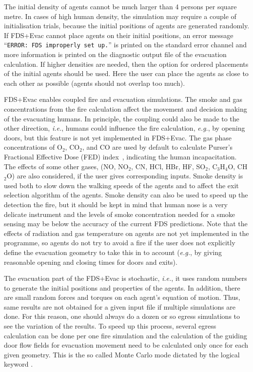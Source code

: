\documentclass[12pt,a4paper,final,twoside]{stylevk}
\begin{document}
The initial density of agents cannot be much larger than 4 persons per
square metre.  In cases of high human density, the simulation may
require a couple of initialisation trials, because the initial
positions of agents are generated randomly.  If FDS+Evac cannot place
agents on their initial positions, an error message ``\texttt{ERROR:
  FDS improperly set up.}'' is printed on the standard error channel
and more information is printed on the diagnostic output file of the
evacuation calculation.  If higher densities are needed, then the
option for ordered placements of the initial agents should be used.
Here the user can place the agents as close to each other as
possible (agents should not overlap too much). 


FDS+Evac enables coupled fire and evacuation simulations.  The smoke
and gas concentrations from the fire calculation affect the movement
and decision making of the evacuating humans.  In principle, the
coupling could also be made to the other direction, \emph{i.e.},
humans could influence the fire calculation, \emph{e.g.}, by opening
doors, but this feature is not yet implemented in FDS+Evac.  The gas
phase concentrations of $\mathrm{O_2}$, $\mathrm{CO_2}$, and
$\mathrm{CO}$ are used by default to calculate Purser's Fractional
Effective Dose (FED) index~\cite{Purser03}, indicating the human
incapacitation.  The effects of some other gases, (NO, NO${}_2$, CN,
HCl, HBr, HF, SO${}_2$, C${}_3$H${}_4$O, CH${}_2$O) are also
considered, if the user gives corresponding inputs.  Smoke density is
used both to slow down the walking speeds of the agents and to affect
the exit selection algorithm of the agents.  Smoke density can also be
used to speed up the detection the fire, but it should be kept in mind
that human nose is a very delicate instrument and the levels of smoke
concentration needed for a smoke sensing may be below the accuracy of
the current FDS predictions.  Note that the effects of radiation and
gas temperature on agents are not yet implemented in the programme, so
agents do not try to avoid a fire if the user does not explicitly
define the evacuation geometry to take this in to account
(\emph{e.g.}, by giving reasonable opening and closing times for doors
and exits).


The evacuation part of the FDS+Evac is stochastic, \emph{i.e.}, it
uses random numbers to generate the initial positions and properties
of the agents.  In addition, there are small random forces and torques
on each agent's equation of motion.  Thus, same results are not
obtained for a given input file if multiple simulations are done.  For
this reason, one should always do a dozen or so egress simulations to
see the variation of the results.  To speed up this process, several
egress calculation can be done per one fire simulation and the
calculation of the guiding door flow fields for evacuation movement
need to be calculated only once for each given geometry.  This is the
so called Monte Carlo mode dictated by the logical keyword
.
\end{document}
